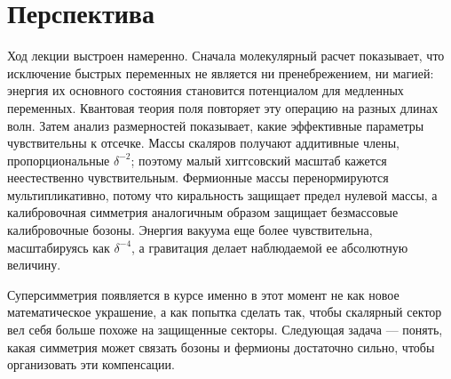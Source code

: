 \begin{classroomqa}
\end{classroomqa}

\begin{classroomqa}
\end{classroomqa}

\section{Перспектива}

Ход лекции выстроен намеренно. Сначала молекулярный расчет показывает, что исключение быстрых переменных не является ни пренебрежением, ни магией: энергия их основного состояния становится потенциалом для медленных переменных. Квантовая теория поля повторяет эту операцию на разных длинах волн. Затем анализ размерностей показывает, какие эффективные параметры чувствительны к отсечке. Массы скаляров получают аддитивные члены, пропорциональные \(\delta^{-2}\); поэтому малый хиггсовский масштаб кажется неестественно чувствительным. Фермионные массы перенормируются мультипликативно, потому что киральность защищает предел нулевой массы, а калибровочная симметрия аналогичным образом защищает безмассовые калибровочные бозоны. Энергия вакуума еще более чувствительна, масштабируясь как \(\delta^{-4}\), а гравитация делает наблюдаемой ее абсолютную величину.

Суперсимметрия появляется в курсе именно в этот момент не как новое математическое украшение, а как попытка сделать так, чтобы скалярный сектор вел себя больше похоже на защищенные секторы. Следующая задача — понять, какая симметрия может связать бозоны и фермионы достаточно сильно, чтобы организовать эти компенсации.
